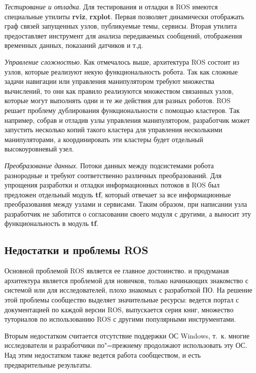 \documentclass[10pt, a5paper]{article}
\begin{document}
\emph{Тестирование и отладка}. Для тестирования и отладки в ROS имеются специальные утилиты \textbf{rviz}, \textbf{rxplot}. Первая позволяет динамически отображать граф связей запущенных узлов, публикуемые темы, сервисы. Вторая утилита предоставляет инструмент для анализа передаваемых сообщений, отображения временных данных, показаний датчиков и т.д.

\emph{Управление сложностью}. Как отмечалось выше, архитектура ROS состоит из узлов, которые реализуют некую функциональность робота. Так как сложные задачи навигации или управления манипулятором требуют множества вычислений, то они как правило реализуются множеством связанных узлов, которые могут выполнять одни и те же действия для разных роботов. ROS решает проблему дублирования функциональности с помощью кластеров. Так например, собрав и отладив узлы управления манипулятором, разработчик может запустить несколько копий такого кластера для управления несколькими манипуляторами, а координировать эти кластеры будет отдельный высокоуровневый узел.

\emph{Преобразование данных}. Потоки данных между подсистемами робота разнородные и требуют соответственно различных преобразований. Для упрощения разработки и отладки информационных потоков в ROS был предложен отдельный модуль \textbf{tf}, который отвечает за все информационные преобразования между узлами и сервисами. Таким образом, при написании узла разработчик не заботится о согласовании своего модуля с другими, а выносит эту функциональность в модуль \textbf{tf}.

\subsection*{Недостатки и проблемы ROS}

Основной проблемой ROS является ее главное достоинство. \linebreak  и продуманая архитектура является проблемой для новичков, только начинающих знакомство с системой или для исследователей, плохо знакомых с разработкой ПО. На решение этой проблемы сообщество выделяет значительные ресурсы: ведется портал с документацией по каждой версии ROS, выпускается серия книг, множество туториалов по использованию ROS с другими популярными инструментами.

Вторым недостатком считается отсутствие поддержки ОС \linebreak Windows, т.~к. многие исследователи и разработчики по"=прежнему продолжают использовать эту ОС. Над этим недостатком также ведется работа сообществом, и есть предварительные результаты.
\end{document}
